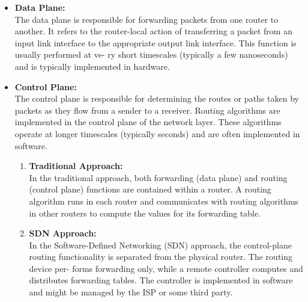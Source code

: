\begin{itemize}
    \item \textbf{Data Plane:} \\
    The data plane is responsible for forwarding packets from one router to another. It refers to the router-local action of transferring a packet from an input link interface to the appropriate output link interface. This function is usually performed at ve- ry short timescales (typically a few nanoseconds) and is typically implemented in hardware.
    
    \item \textbf{Control Plane:} \\
    The control plane is responsible for determining the routes or paths taken by packets as they flow from a sender to a receiver. Routing algorithms are implemented in the control plane of the network layer. These algorithms operate at longer timescales (typically seconds) and are often implemented in software.
    
    \begin{enumerate}[nolistsep]
        \item \textbf{Traditional Approach:} \\
        In the traditional approach, both forwarding (data plane) and routing (control plane) functions are contained within a router. A routing algorithm runs in each router and communicates with routing algorithms in other routers to compute the values for its forwarding table.
        
        \item \textbf{SDN Approach:} \\
        In the Software-Defined Networking (SDN) approach, the control-plane routing functionality is separated from the physical router. The routing device per- forms forwarding only, while a remote controller computes and distributes forwarding tables. The controller is implemented in software and might be managed by the ISP or some third party.
    \end{enumerate}
\end{itemize}

\renewcommand*{\thefootnote}{\fnsymbol{footnote}}
\renewcommand*{\thefootnote}{\arabic{footnote}}

